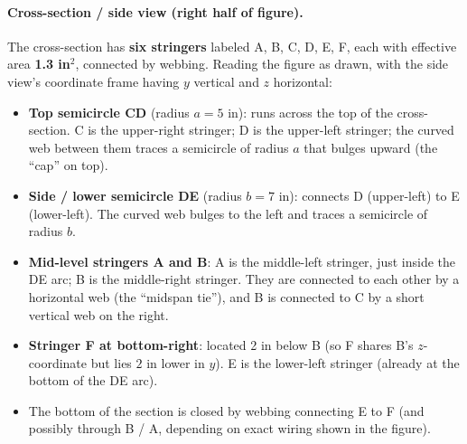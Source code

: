 \documentclass[11pt]{article}
\begin{document}
\paragraph{Cross-section / side view (right half of figure).}
The cross-section has \textbf{six stringers} labeled A, B, C, D, E, F, each with effective area \textbf{1.3 in$^2$}, connected by webbing. Reading the figure as drawn, with the side view's coordinate frame having $y$ vertical and $z$ horizontal:
\begin{itemize}[leftmargin=2em, itemsep=2pt]
  \item \textbf{Top semicircle CD} (radius $a = 5$ in): runs across the top of the cross-section. C is the upper-right stringer; D is the upper-left stringer; the curved web between them traces a semicircle of radius $a$ that bulges upward (the ``cap'' on top).
  \item \textbf{Side / lower semicircle DE} (radius $b = 7$ in): connects D (upper-left) to E (lower-left). The curved web bulges to the left and traces a semicircle of radius $b$.
  \item \textbf{Mid-level stringers A and B}: A is the middle-left stringer, just inside the DE arc; B is the middle-right stringer. They are connected to each other by a horizontal web (the ``midspan tie''), and B is connected to C by a short vertical web on the right.
  \item \textbf{Stringer F at bottom-right}: located 2 in below B (so F shares B's $z$-coordinate but lies $2$ in lower in $y$). E is the lower-left stringer (already at the bottom of the DE arc).
  \item The bottom of the section is closed by webbing connecting E to F (and possibly through B / A, depending on exact wiring shown in the figure).
\end{itemize}
\end{document}
